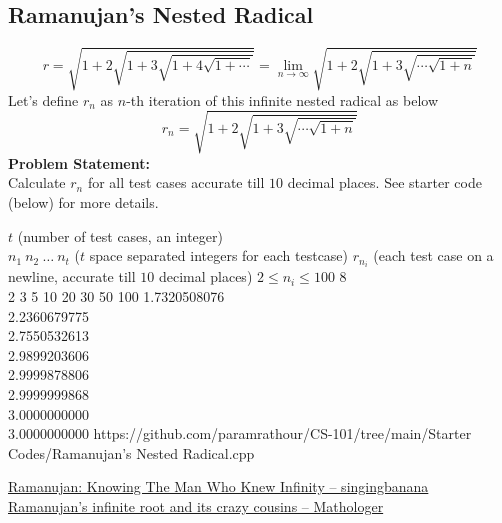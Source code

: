 \documentclass[../../Problems]{subfiles}
\begin{document}
\subsection{Ramanujan's Nested Radical}{\label{pp:ramanujanradical}}
\begin{equation}
{ r={\sqrt{1+2{\sqrt{1+3{\sqrt{1+4{\sqrt{1+\cdots }} }}}}}} = \lim_{n\rightarrow\infty} {\sqrt {1+2{\sqrt {1+3{\sqrt {\cdots \sqrt{1+ n}}}}}}}}
\end{equation}
Let's define $r_n$ as $n$-th iteration of this infinite nested radical as below
\begin{equation*}
{ r_n={\sqrt {1+2{\sqrt {1+3{\sqrt {\cdots \sqrt{1+ n}}}}}}}}
\end{equation*}
\textbf{Problem Statement:}\\
Calculate $r_n$ for all test cases accurate till $10$ decimal places. See starter code (below) for more details.
\begin{testcases}
	{$t$ \hfill(number of test cases, an integer)\\$n_1\ n_2\ \ldots\ n_t$ \hfill($t$ space separated integers for each testcase)}
	{$r_{n_i}$ \hfill(each test case on a newline, accurate till $10$ decimal places)}
	{$2 \leq n_i \leq 100$}
	{8\\2 3 5 10 20 30 50 100}
	{1.7320508076\\2.2360679775\\2.7550532613\\2.9899203606\\2.9999878806\\2.9999999868\\3.0000000000\\3.0000000000}
	{https://github.com/paramrathour/CS-101/tree/main/Starter Codes/Ramanujan's Nested Radical.cpp}
\end{testcases}
\begin{funvideo}
\href{https://youtu.be/HMGZVKwYNfk}{Ramanujan: Knowing The Man Who Knew Infinity -- singingbanana}\\
\href{https://youtu.be/leFep9yt3JY}{Ramanujan's infinite root and its crazy cousins -- Mathologer}
\end{funvideo}
\end{document}
